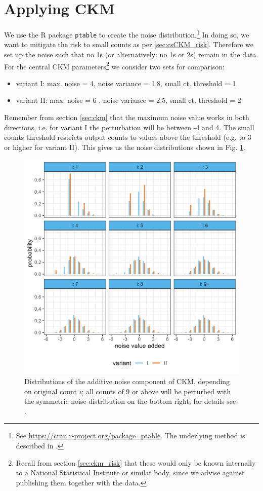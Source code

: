 \section{Applying CKM} \label{sec:csCKM_applyCKM}

We use the R package \texttt{ptable} to create the noise distribution.\footnote{
    See \url{https://cran.r-project.org/package=ptable}. The underlying method is described in \citet{Giessing2016}.}
In doing so, we want to mitigate the risk to small counts as per \ref{sec:csCKM_risk}. Therefore we set up the noise such that no 1s (or alternatively: no 1s or 2s) remain in the data. For the central CKM parameters\footnote{
    Recall from section \ref{sec:ckm_risk} that these would only be known internally to a National Statistical Institute or similar body, since we advise against publishing them together with the data.} 
we consider two sets for comparison:
\begin{itemize}
    \item variant I: max. noise = 4, noise variance = 1.8, small ct. threshold = 1
    \item variant II: max. noise  = 6 , noise variance = 2.5, small ct. threshold = 2
\end{itemize}
Remember from section \ref{sec:ckm} that the maximum noise value works in both directions, i.e. for variant I the perturbation will be between -4 and 4. The small counts threshold restricts output counts to values above the threshold (e.g. to 3 or higher for variant II).
This gives us the noise distributions shown in Fig. \ref{fig:cs_pt}.

\begin{figure}[H]
    \centering
    \includegraphics[width=0.9\linewidth]{figures/CaseStudy_CKM/pt_casestudy2.png}
    \caption{Distributions of the additive noise component of CKM, depending on original count $i$; all counts of 9 or above will be perturbed with the symmetric noise distribution on the bottom right; for details see \cite{Enderle2023}.}
    \label{fig:cs_pt}
\end{figure}

